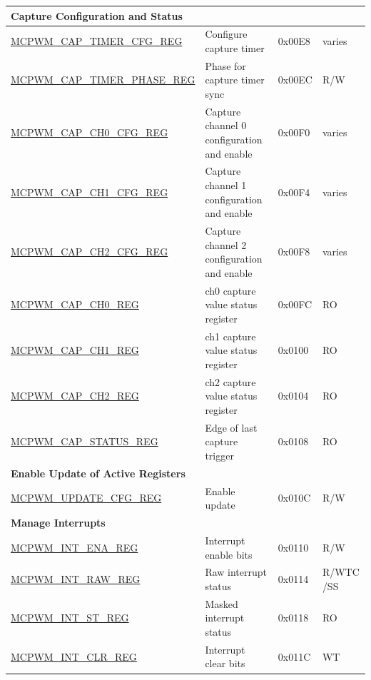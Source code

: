 \begin{longtable}{ | p{6cm} | p{7.2cm} | p{1.3cm} | p{1cm} | }
\multicolumn{4}{|l|}{\textbf{Capture Configuration and Status}} \\ \hline
\hyperref[regdesc:MCPWMCAPTIMERCFGREG]{MCPWM\_CAP\_TIMER\_CFG\_REG} & Configure capture timer & 0x00E8 & varies \\ \hline
\hyperref[regdesc:MCPWMCAPTIMERPHASEREG]{MCPWM\_CAP\_TIMER\_PHASE\_REG} & Phase for capture timer sync & 0x00EC & R/W \\ \hline
\hyperref[regdesc:MCPWMCAPCHNCFGREG]{MCPWM\_CAP\_CH0\_CFG\_REG} & Capture channel 0 configuration and enable & 0x00F0 & varies \\ \hline
\hyperref[regdesc:MCPWMCAPCHNCFGREG]{MCPWM\_CAP\_CH1\_CFG\_REG} & Capture channel 1 configuration and enable & 0x00F4 & varies \\ \hline
\hyperref[regdesc:MCPWMCAPCHNCFGREG]{MCPWM\_CAP\_CH2\_CFG\_REG} & Capture channel 2 configuration and enable & 0x00F8 & varies \\ \hline
\hyperref[regdesc:MCPWMCAPCHNREG]{MCPWM\_CAP\_CH0\_REG} & ch0 capture value status register & 0x00FC & RO \\ \hline
\hyperref[regdesc:MCPWMCAPCHNREG]{MCPWM\_CAP\_CH1\_REG} & ch1 capture value status register & 0x0100 & RO \\ \hline
\hyperref[regdesc:MCPWMCAPCHNREG]{MCPWM\_CAP\_CH2\_REG} & ch2 capture value status register & 0x0104 & RO \\ \hline
\hyperref[regdesc:MCPWMCAPSTATUSREG]{MCPWM\_CAP\_STATUS\_REG} & Edge of last capture trigger & 0x0108 & RO \\ \hline
\multicolumn{4}{|l|}{\textbf{Enable Update of Active Registers}} \\ \hline
\hyperref[regdesc:MCPWMUPDATECFGREG]{MCPWM\_UPDATE\_CFG\_REG} & Enable update & 0x010C & R/W \\ \hline

\multicolumn{4}{|l|}{\textbf{Manage Interrupts}} \\ \hline
\hyperref[regdesc:MCPWMINTENAREG]{MCPWM\_INT\_ENA\_REG} & Interrupt enable bits & 0x0110 & R/W \\ \hline
\hyperref[regdesc:MCPWMINTRAWREG]{MCPWM\_INT\_RAW\_REG} & Raw interrupt status & 0x0114 & R/WTC
/SS \\ \hline
\hyperref[regdesc:MCPWMINTSTREG]{MCPWM\_INT\_ST\_REG} & Masked interrupt status & 0x0118 & RO \\ \hline
\hyperref[regdesc:MCPWMINTCLRREG]{MCPWM\_INT\_CLR\_REG} & Interrupt clear bits & 0x011C & WT \\ \hline


\end{longtable}
